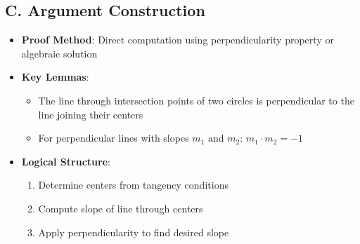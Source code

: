 \documentclass[12pt]{article}
\begin{document}
\begin{strategicbox}
\subsection*{C. Argument Construction}
\begin{itemize}[leftmargin=*]
    \item \textbf{Proof Method}: Direct computation using perpendicularity property or algebraic solution
    \item \textbf{Key Lemmas}: 
    \begin{itemize}
        \item The line through intersection points of two circles is perpendicular to the line joining their centers
        \item For perpendicular lines with slopes $m_1$ and $m_2$: $m_1 \cdot m_2 = -1$
    \end{itemize}
    \item \textbf{Logical Structure}: 
    \begin{enumerate}
        \item Determine centers from tangency conditions
        \item Compute slope of line through centers
        \item Apply perpendicularity to find desired slope
    \end{enumerate}
\end{itemize}
\end{strategicbox}
\end{document}
